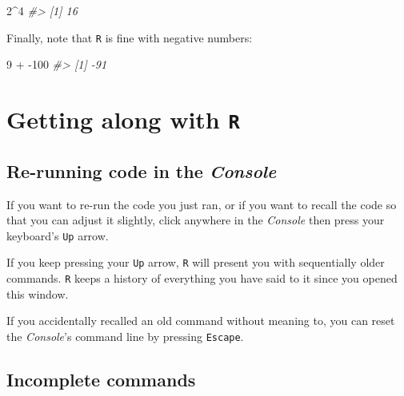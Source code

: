\documentclass[
]{book}
\newenvironment{Shaded}{\begin{snugshade}}{\end{snugshade}}
\newcommand{\CommentTok}[1]{\textcolor[rgb]{0.56,0.35,0.01}{\textit{#1}}}
\newcommand{\DecValTok}[1]{\textcolor[rgb]{0.00,0.00,0.81}{#1}}
\newcommand{\SpecialCharTok}[1]{\textcolor[rgb]{0.00,0.00,0.00}{#1}}
\begin{document}
\begin{Shaded}
\begin{Highlighting}[]
\DecValTok{2}\SpecialCharTok{\^{}}\DecValTok{4}
\CommentTok{\#\textgreater{} [1] 16}
\end{Highlighting}
\end{Shaded}

Finally, note that \texttt{R} is fine with negative numbers:

\begin{Shaded}
\begin{Highlighting}[]
\DecValTok{9} \SpecialCharTok{+} \SpecialCharTok{{-}}\DecValTok{100}
\CommentTok{\#\textgreater{} [1] {-}91}
\end{Highlighting}
\end{Shaded}

\hypertarget{getting-along-with-r}{%
\section*{\texorpdfstring{Getting along with \texttt{R}}{Getting along with R}}\label{getting-along-with-r}}

\hypertarget{re-running-code-in-the-console}{%
\subsection*{\texorpdfstring{Re-running code in the \emph{Console}}{Re-running code in the Console}}\label{re-running-code-in-the-console}}

If you want to re-run the code you just ran, or if you want to recall the code so that you can adjust it slightly, click anywhere in the \emph{Console} then press your keyboard's \texttt{Up} arrow.

If you keep pressing your \texttt{Up} arrow, \texttt{R} will present you with sequentially older commands. \texttt{R} keeps a history of everything you have said to it since you opened this window.

If you accidentally recalled an old command without meaning to, you can reset the \emph{Console}'s command line by pressing \texttt{Escape}.

\hypertarget{incomplete-commands}{%
\subsection*{Incomplete commands}\label{incomplete-commands}}
\end{document}

